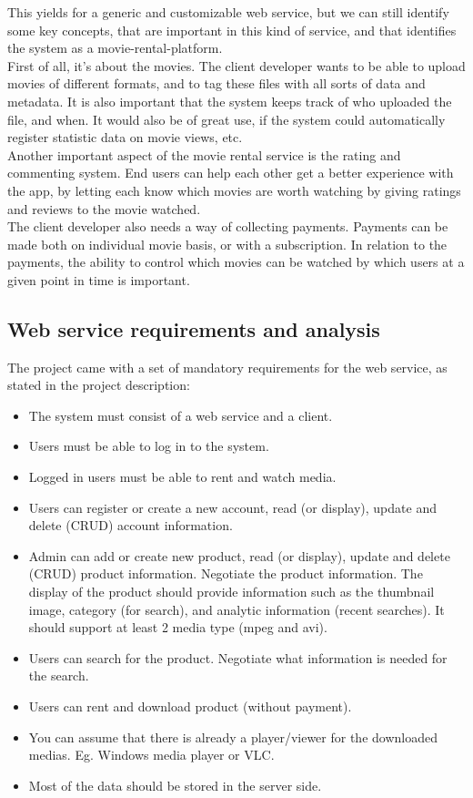 \documentclass[10pt,a4paper]{article}
\begin{document}
This yields for a generic and customizable web service, but we can still identify some key concepts, that are important in this kind of service, and that identifies the system as a movie-rental-platform. \\

First of all, it’s about the movies. The client developer wants to be able to upload movies of different formats, and to tag these files with all sorts of data and metadata. It is also important that the system keeps track of who uploaded the file, and when. It would also be of great use, if the system could automatically register statistic data on movie views, etc. \\

Another important aspect of the movie rental service is the rating and commenting system. End users can help each other get a better experience with the app, by letting each know which movies are worth watching by giving ratings and reviews to the movie watched. \\

The client developer also needs a way of collecting payments. Payments can be made both on individual movie basis, or with a subscription. In relation to the payments, the ability to control which movies can be watched by which users at a given point in time is important.

\subsection{Web service requirements and analysis}
The project came with a set of mandatory requirements for the web service, as stated in the project description:
\begin{itemize}
	\item The system must consist of a web service and a client.
	\item Users must be able to log in to the system.
	\item Logged in users must be able to rent and watch media.
	\item Users can register or create a new account, read (or display), update and delete (CRUD) account information.
	\item Admin can add or create new product, read (or display), update and delete (CRUD) product information. Negotiate the product information. The display of the product should provide information such as the thumbnail image, category (for search), and analytic information (recent searches). It should support at least 2 media type (mpeg and avi).
	\item Users can search for the product. Negotiate what information is needed for the search.
	\item Users can rent and download product (without payment).
	\item You can assume that there is already a player/viewer for the downloaded medias. Eg. Windows media player or VLC.
	\item Most of the data should be stored in the server side.
\end{itemize}
\end{document}
